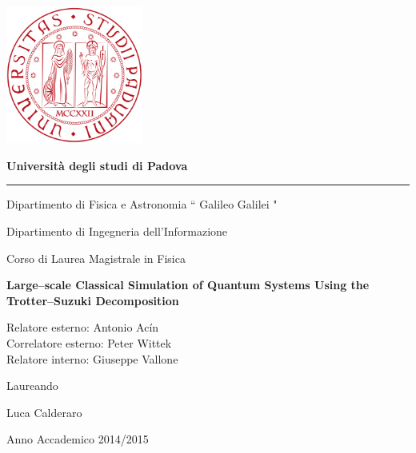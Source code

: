 \begin{titlepage}

\setlength{}
\setlength{}

\begin{center}
\vspace*{-2. cm}
\includegraphics[width=4.5cm]{Figs/Logo_Universita_Padova.png}
\vspace*{1 cm}

{\bfseries{\huge Universit\`a degli studi di Padova} }
\hrule

\vspace{1 cm}

{\Large Dipartimento di Fisica e Astronomia  `` Galileo Galilei "} 

\vspace{0.5cm}

{\Large Dipartimento di Ingegneria dell'Informazione} 
\vspace{1cm}

{\Large Corso di Laurea Magistrale in} 
{\Large Fisica}

\vspace{1.5 cm}

{\LARGE{\bfseries {Large--scale Classical Simulation of Quantum Systems Using the Trotter--Suzuki Decomposition}}} 
\end{center}

\vfill
\raggedright     
\large{Relatore esterno: Antonio Acín}  \\
\vspace{0.08cm}
\large{Correlatore esterno: Peter Wittek}  \\
\vspace{0.08 cm}
\large{Relatore interno: Giuseppe Vallone}  \\
\vspace{0.08cm}

\raggedleft
\large{Laureando}

\large{Luca Calderaro} 

\vspace{2cm}
\begin{center}
{\large{ Anno Accademico 2014/2015}}
\end{center}
\vspace{-1.5cm}

\end{titlepage}